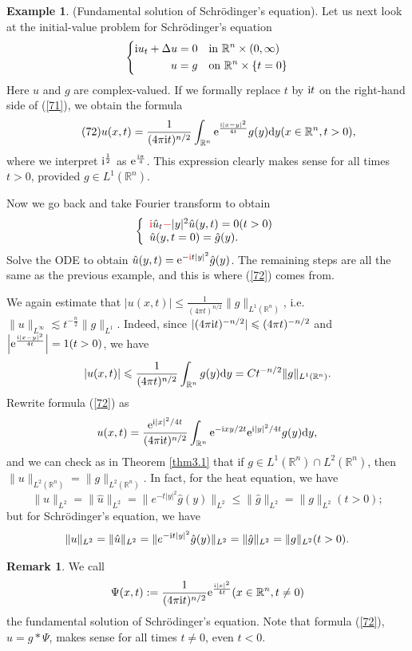 \documentclass[hyperref,UTF8,12pt]{article}
\numberwithin{equation}{subsection}
\theoremstyle{plain}
\theoremstyle{definition}
\newtheorem{remark}{Remark}
\newtheorem{example}{Example}
\numberwithin{theorem}{section}
\numberwithin{lemma}{section}
\numberwithin{proposition}{section}
\numberwithin{remark}{section}
\numberwithin{corollary}{section}
\numberwithin{definition}{section}
\numberwithin{problem}{section}
\numberwithin{example}{section}
\def\e{\textup{e}}
\def\i{\textup{i}}
\def\dif{\textup{d}}
\newcommand{\mr}{\mathbb{R}}
\renewcommand{\leq}{\leqslant}
\begin{document}
\begin{example}
(Fundamental solution of Schrödinger's equation). Let us next look at the initial-value problem for Schrödinger's equation \[\left\{\begin{aligned}
	\i u_t+\Delta u=0&\quad\text{in } \mr^n\times(0,\infty)\\
	u=g&\quad\text{on } \mr^n\times\{t=0\}
\end{aligned}\right.\]Here $u$ and $g$ are complex-valued. If we formally replace $t$ by $\i t$ on the right-hand side of (\ref{71}), we obtain the formula\[\tag{72}\label{72}u(x,t)= \frac{1}{(4\pi\i t)^{n/2}}\int_{\mr^n}\e^{\frac{\i|x-y|^2}{4t}}g(y)\dif y(x\in\mr^n, t>0),\]where we interpret $\i^{\frac{1}{2}}$ as $\e^{\frac{\i\pi}{4}}$. This expression clearly makes sense for all times $t>0$, provided $g\in L^1(\mr^n)$.

Now we go back and take Fourier transform to obtain \[\left\{\begin{array}{l}
	{\color{red}\i}\hat{u}_t{\color{red}-}|y|^2\hat{u}(y,t)=0(t>0)\\
	\hat{u}(y,t=0)=\hat{g}(y).
\end{array}\right.\]Solve the ODE to obtain $\hat{u}(y,t)=\e^{-{\color{red}\i}t|y|^2} \hat{g}(y)$. The remaining steps are all the same as the previous example, and this is where (\ref{72}) comes from.

We again estimate that $|u(x,t)|\leq\frac{1}{(4\pi t)^{n/2}}\|g\|_{L^1(\mr^n)}$, i.e. $\|u\|_{L^\infty}\lesssim t^{-\frac{n}{2}}\|g\|_{L^1}$. Indeed, since $|(4\pi\i t)^{-n/2}|\leq(4\pi t)^{-n/2}$ and $\left|\e^{\frac{\i|x-y|^2}{4t}}\right|=1(t>0)$, we have \[
|u(x,t)|\leq\frac{1}{(4\pi t)^{n/2}}\int_{\mr^n}g(y)\dif y=Ct^{-n/2}\|g\|_{L^1(\mr^n)}. \]Rewrite formula (\ref{72}) as\[u(x,t)=\frac{\e^{\i|x|^2/4t}}{(4\pi\i t)^{n/2}}\int_ {\mr^n}\e^{-\i xy/2t}\e^{\i|y|^2/4t}g(y)\dif y,\]and we can check as in Theorem \ref{thm3.1} that if $g\in L^1(\mr^n)\cap L^2(\mr^n)$, then $\|u\|_{L^2(\mr^n)} =\|g\|_{L^2(\mr^n)}$. In fact, for the heat equation, we have\[\|u\|_{L^2}=\|\hat{u}\|_
{L^2}=\|e^{-t|y|^2}\hat{g}(y)\|_{L^2}\leq\|\hat{g}\|_{L^2}=\|g\|_{L^2}(t>0);\] but for Schrödinger's equation, we have\[\|u\|_{L^2}=\|\hat{u}\|_{L^2}=\|e^{-\i t|y|^2}\hat{g}(y)\|
_{L^2}=\|\hat{g}\|_{L^2}=\|g\|_{L^2}(t>0).\]
\end{example}
\begin{remark}
We call\[\Psi(x,t):=\frac{1}{(4\pi\i t)^{n/2}}\e^{\frac{\i|x|^2}{4t}}(x\in\mr^n,t\neq0)\] the fundamental solution of Schrödinger's equation. Note that formula (\ref{72}), $u=g*\Psi$, makes sense for all times $t\neq0$, even $t<0$.
\end{remark}
\end{document}

